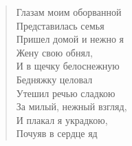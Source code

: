 \begin{verse}
\begin{altverse}
Глазам моим оборванной\\
     Представилась семья\ldotst\\
Пришел домой и нежно я\\
     Жену свою обнял,\\
И в щечку белоснежную\\
     Бедняжку целовал\ldotst\\
Утешил речью сладкою\\
     За милый, нежный взгляд,\\
И плакал я украдкою,\\
     Почуяв в сердце яд\ldotst
\end{altverse}
\end{verse}


\newpage
\vspace*{0cm}

